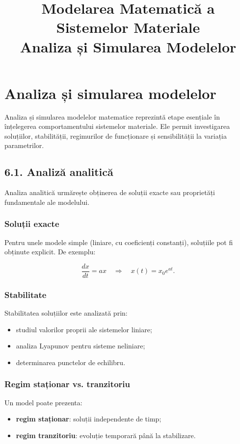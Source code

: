 \documentclass[12pt,a4paper]{article}
\title{Modelarea Matematică a Sistemelor Materiale \\ \large Analiza și Simularea Modelelor}
\author{}
\date{}
\begin{document}
\maketitle

\section{Analiza și simularea modelelor}

Analiza și simularea modelelor matematice reprezintă etape esențiale în înțelegerea comportamentului sistemelor materiale. Ele permit investigarea soluțiilor, stabilității, regimurilor de funcționare și sensibilității la variația parametrilor.

\subsection{6.1. Analiză analitică}

Analiza analitică urmărește obținerea de soluții exacte sau proprietăți fundamentale ale modelului.

\subsubsection*{Soluții exacte}
Pentru unele modele simple (liniare, cu coeficienți constanți), soluțiile pot fi obținute explicit. De exemplu:


\[
\frac{dx}{dt} = ax \quad \Rightarrow \quad x(t) = x_0 e^{at}.
\]



\subsubsection*{Stabilitate}
Stabilitatea soluțiilor este analizată prin:
\begin{itemize}
    \item studiul valorilor proprii ale sistemelor liniare;
    \item analiza Lyapunov pentru sisteme neliniare;
    \item determinarea punctelor de echilibru.
\end{itemize}

\subsubsection*{Regim staționar vs. tranzitoriu}
Un model poate prezenta:
\begin{itemize}
    \item \textbf{regim staționar}: soluții independente de timp;
    \item \textbf{regim tranzitoriu}: evoluție temporară până la stabilizare.
\end{itemize}
\end{document}

